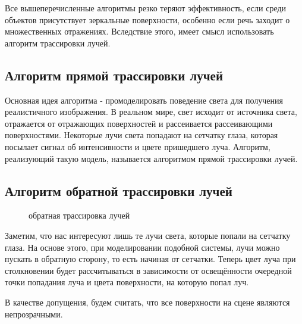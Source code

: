 \documentclass[a4paper, 14pt]{report} %
\begin{document}
	Все вышеперечисленные алгоритмы резко теряют эффективность, если среди объектов присутствует зеркальные поверхности, особенно если речь заходит о множественных отражениях. Вследствие этого, имеет смысл использовать алгоритм трассировки лучей.
	
	\subsection{Алгоритм прямой трассировки лучей}
	Основная идея алгоритма - промоделировать поведение света для получения реалистичного изображения. В реальном мире, свет исходит от источника света, отражается от отражающих поверхностей и рассеивается рассеивающими поверхностями. Некоторые лучи света попадают на сетчатку глаза, которая посылает сигнал об интенсивности и цвете пришедшего луча. Алгоритм, реализующий такую модель, называется алгоритмом прямой трассировки лучей.
	
	\subsection{Алгоритм обратной трассировки лучей}
	\begin{figure}[ht]
		\caption{обратная трассировка лучей}
		\label{backward_ray_trace}
	\end{figure}

	Заметим, что нас интересуют лишь те лучи света, которые попали на сетчатку глаза. На основе этого, при моделировании подобной системы, лучи можно пускать в обратную сторону, то есть начиная от сетчатки. Теперь цвет луча при столкновении будет рассчитываться в зависимости от освещённости очередной точки попадания луча и цвета поверхности, на которую попал луч.
	
	В качестве допущения, будем считать, что все поверхности на сцене являются непрозрачными.
	
\end{document}
